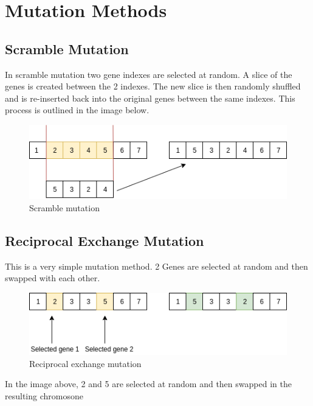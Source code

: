 \section{Mutation Methods}

\subsection{Scramble Mutation}

In scramble mutation two gene indexes are selected at random. A slice of the genes is created between the 2 indexes. The new slice is then randomly shuffled and is re-inserted back into the original genes between the same indexes. This process is outlined in the image below.

\begin{figure}[h!]
\vspace{-5pt}
\centering
\includegraphics[width=1.0\textwidth]{images/scramble.png}
\caption{\label{fig:3col_graph}Scramble mutation}
\end{figure}

\subsection{Reciprocal Exchange Mutation}

This is a very simple mutation method. 2 Genes are selected at random and then swapped with each other.

\begin{figure}[h!]
\vspace{-5pt}
\centering
\includegraphics[width=1.0\textwidth]{images/reciprocal.png}
\caption{\label{fig:3col_graph}Reciprocal exchange mutation}
\end{figure}

In the image above, 2 and 5 are selected at random and then swapped in the resulting chromosone